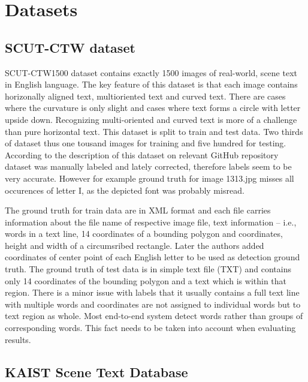 \chapter{Datasets}


\section{SCUT-CTW dataset}

SCUT-CTW1500 dataset contains exactly 1500 images of real-world, scene text in English language. The key feature of this dataset is that each image contains horizonally aligned text, multioriented text and curved text. There are cases where the curvature is only slight and cases where text forms a circle with letter upside down. Recognizing multi-oriented and curved text is more of a challenge than pure horizontal text. This dataset is split to train and test data. Two thirds of dataset thus one tousand images for training and five hundred for testing. According to the description of this dataset on relevant GitHub repository dataset was manually labeled and lately corrected, therefore labels seem to be very accurate. However for example ground truth for image 1313.jpg misses all occurences of letter I, as the depicted font was probably misread.\cite{ctw,ctw2}

The ground truth for train data are in XML format and each file carries information about the file name of respective image file, text information -- i.e., words in a text line, 14 coordinates of a bounding polygon and coordinates, height and width of a circumsribed rectangle. Later the authors added coordinates of center point of each English letter to be used as detection ground truth. The ground truth of test data is in simple text file (TXT) and contains only 14 coordinates of the bounding polygon and a text which is within that region. There is a minor issue with labels that it usually contains a full text line with multiple words and coordinates are not assigned to individual words but to text region as whole. Most end-to-end system detect words rather than groups of corresponding words. This fact needs to be taken into account when evaluating results.

\section{KAIST Scene Text Database}

